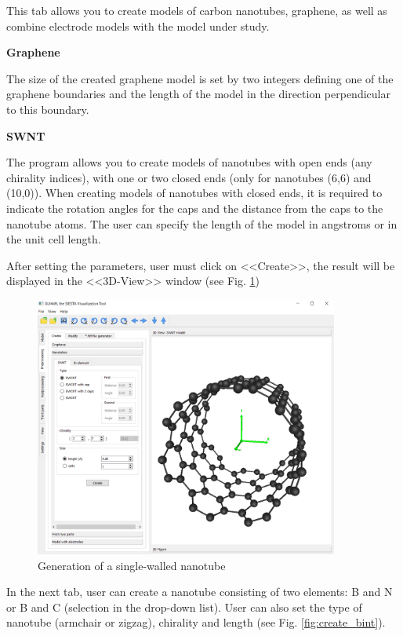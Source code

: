 \documentclass{article}
\begin{document}
This tab allows you to create models of carbon nanotubes, graphene, as well as combine electrode models with the model under study.

\textbf{Graphene}

The size of the created graphene model is set by two integers defining one of the graphene boundaries and the length of the model in the direction perpendicular to this boundary.

\textbf{SWNT}

The program allows you to create models of nanotubes with open ends (any chirality indices), with one or two closed ends (only for nanotubes (6,6) and (10,0)). When creating models of nanotubes with closed ends, it is required to indicate the rotation angles for the caps and the distance from the caps to the nanotube atoms. The user can specify the length of the model in angstroms or in the unit cell length.

After setting the parameters, user must click on <<Create>>, the result will be displayed in the <<3D-View>> window (see Fig. \ref{fig:createswnt})

\begin{figure}[h!]
	\centering
	\includegraphics[width=10.0cm]{create_swnt}
	\caption{Generation of a single-walled nanotube}
	\label{fig:createswnt}
\end{figure}

In the next tab, user can create a nanotube consisting of two elements: B and N or B and C (selection in the drop-down list). User can also set the type of nanotube (armchair or zigzag), chirality and length (see Fig. \ref{fig:create_bint}).
\end{document}
